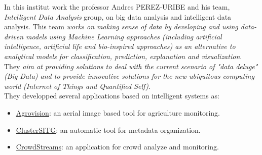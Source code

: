 \documentclass[12pt, a4paper]{report}
\begin{document}
	In this institut work the professor Andres PEREZ-URIBE and his team, {\itshape Intelligent Data Analysis} group, on big data analysis and intelligent data analysis.
	This team {\itshape works on making sense of data by developing and using data-driven models using Machine Learning approaches (including artificial intelligence, artificial life and bio-inspired approaches) as an alternative to analytical models for classification, prediction, explanation and visualization}.
	They {\itshape aim at providing solutions to deal with the current scenario of "data deluge" (Big Data) and to provide innovative solutions for the new ubiquitous computing world (Internet of Things and Quantified Self)}.\\
	They developped several applications based on intelligent systems as:
	\begin{itemize}
		\item \href{http://iict.heig-vd.ch/projets#/49/agrovision-developpement-dun-outil-de-suivi-base-sur-limagerie-aerienne-a-haute-resolution-pour-une-meilleure-gestion-agronomique-et-environnementale-de-lagriculture}{Agrovision}: an aerial image based tool for agriculture monitoring.
		\item \href{http://iict.heig-vd.ch/projets#/47/clustersitg-semantic-analysis-and-clustering-of-sitg-catalogue}{ClusterSITG}: an automatic tool for metadata organization.
		\item \href{http://iict.heig-vd.ch/projets#/43/crowdstreams-analyse-et-surveillance-en-temps-r-el-de-mobilit-la-proximit-des-grands-v-nements}{CrowdStreams}: an application for crowd analyze and monitoring.
	\end{itemize}
\end{document}
